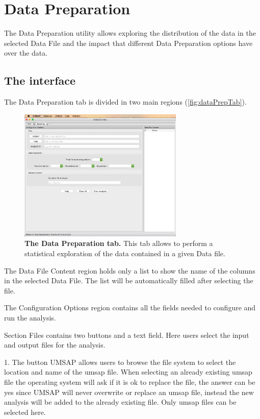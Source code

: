 \chapter{Data Preparation}
\label{chap:dataPrep}

The Data Preparation utility allows exploring the distribution of the data in the
selected Data File and the impact that different Data Preparation options have over
the data.

\section{The interface}

The Data Preparation tab is divided in two main regions (\autoref{fig:dataPrepTab}).

\begin{figure}[h]
    \centering
    \includegraphics[width=0.7\textwidth]{./IMAGES/DATAPREP/DataPrep.jpg}
    \caption[The Data Preparation tab]{\textbf{The Data Preparation tab.}
    This tab allows to perform a statistical exploration of the data contained in
    a given Data file.} 
    \label{fig:dataPrepTab}
    \vspace{-5pt}
\end{figure}

The Data File Content region holds only a list to show the name of the columns in
the selected Data File. The list will be automatically filled after selecting the
file.

The Configuration Options region contains all the fields needed to configure and
run the analysis. 

Section Files contains two buttons and a text field. Here users select the input
and output files for the analysis.

\num{1}. The button UMSAP allows users to browse the file system to select the location
and name of the umsap file. When selecting an already existing umsap file the operating
system will ask if it is ok to replace the file, the answer can be yes since UMSAP
will never overwrite or replace an umsap file, instead the new analysis will be
added to the already existing file. Only umsap files can be selected here.

